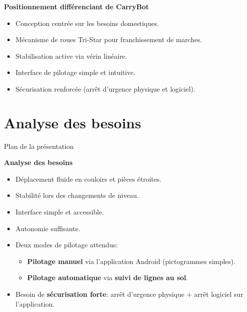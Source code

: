 \documentclass[10pt,aspectratio=169]{beamer}
\begin{document}
\begin{frame}{\textbf{Positionnement différenciant de CarryBot}}
\begin{itemize}
    \item<1-> Conception centrée sur les besoins domestiques.
    \item<2-> Mécanisme de roues Tri-Star pour franchissement de marches.
    \item<3-> Stabilisation active via vérin linéaire.
    \item<4-> Interface de pilotage simple et intuitive.
    \item<5-> Sécurisation renforcée (arrêt d’urgence physique et logiciel).
\end{itemize}
\end{frame} 

\section{Analyse des besoins}
\begin{frame}{Plan de la présentation}
\tableofcontents[currentsection, ]
\end{frame}

\begin{frame}{\textbf{Analyse des besoins}}

\begin{itemize}
    \item Déplacement fluide en couloirs et pièces étroites.
    \item Stabilité lors des changements de niveau.
    \item Interface simple et accessible.
    \item Autonomie suffisante.

    \item Deux modes de pilotage attendus:
    \begin{itemize}
        \item \textbf{Pilotage manuel} via l’application Android (pictogrammes simples).
        \item \textbf{Pilotage automatique} via \textbf{suivi de lignes au sol}.
    \end{itemize}
    \item Besoin de \textbf{sécurisation forte}: arrêt d’urgence physique
    + arrêt logiciel sur l’application.
\end{itemize}

\end{frame}
\end{document}
